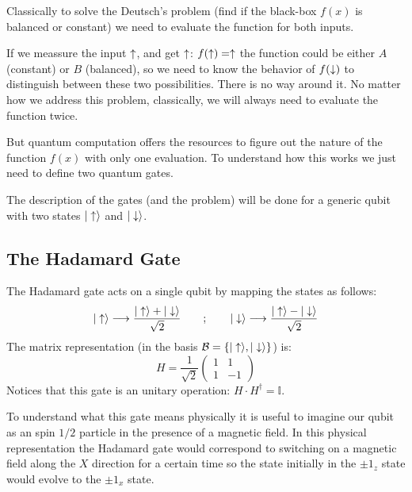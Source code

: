 Classically to solve the Deutsch's problem (find if the black-box $f(x)$ is balanced or constant) we need to evaluate the function for both inputs.

If we meassure the input $\uparrow$, and get $\uparrow$: $f(\uparrow)=\uparrow$ the function could be either $A$ (constant) or $B$ (balanced), so we need to know the behavior of $f(\downarrow)$ to distinguish between these two possibilities.
There is no way around it. No matter how we address this problem, classically, we will always need to evaluate the function twice.

But quantum computation offers the resources to figure out the nature of the function $f(x)$ with only one evaluation. To understand how this works we just need to define two quantum gates.

The description of the gates (and the problem) will be done for a generic qubit with two states $|\uparrow\rangle$ and $|\downarrow\rangle$.

\subsection{The Hadamard Gate}
The Hadamard gate acts on a single qubit by mapping the states as follows:
\begin{equation}
  |\uparrow\rangle \longrightarrow \frac{|\uparrow\rangle+|\downarrow\rangle}{\sqrt{2}}
  \quad\quad;\quad\quad
  |\downarrow\rangle \longrightarrow \frac{|\uparrow\rangle-|\downarrow\rangle}{\sqrt{2}}
\label{Hmap}
\end{equation}
The matrix representation (in the basis $\mathcal{B}=\left\{|\uparrow\rangle,|\downarrow\rangle\right\}$) is:
\begin{equation}
  H=\frac{1}{\sqrt{2}}\left(\begin{array}{cc}
  1 & 1 \\
  1 & -1
  \end{array}\right)
\label{hadamard}
\end{equation}
Notices that this gate is an unitary operation: $H\cdot H^{\dagger}=\mathbb{I}$.

To understand what this gate means physically it is useful to imagine our qubit as an spin $1/2$ particle in the presence of a magnetic field.
In this physical representation the Hadamard gate would correspond to switching on a magnetic field along the $X$ direction for a certain time so the state initially in the $\pm1_z$ state would evolve to the $\pm1_x$ state.

